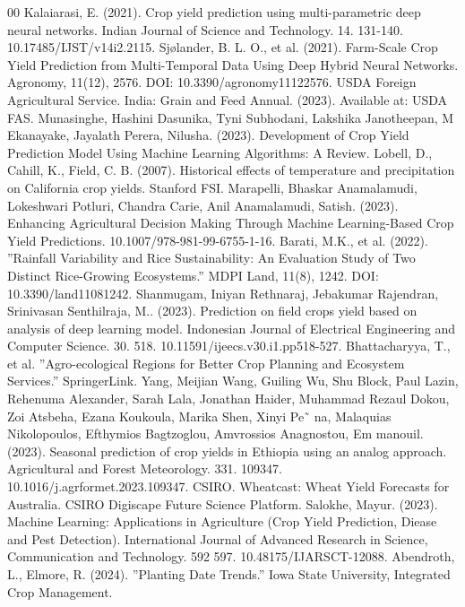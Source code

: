 \documentclass[conference]{IEEEtran}
\begin{document}
\begin{thebibliography}{00}
 Kalaiarasi, E. (2021). Crop yield prediction using multi-parametric deep neural networks. Indian Journal of Science and Technology. 14. 131-140. 10.17485/IJST/v14i2.2115. 
 Sjølander, B. L. O., et al. (2021). Farm-Scale Crop Yield Prediction from Multi-Temporal Data Using Deep Hybrid Neural Networks. Agronomy, 11(12), 2576. DOI: 10.3390/agronomy11122576. 
 USDA Foreign Agricultural Service. India: Grain and Feed Annual. (2023). Available at: USDA FAS. 
 Munasinghe, Hashini Dasunika, Tyni Subhodani, Lakshika Janotheepan, M Ekanayake, Jayalath Perera, Nilusha. (2023). Development of Crop Yield Prediction Model Using Machine Learning Algorithms: A Review.  
 Lobell, D., Cahill, K., Field, C. B. (2007). Historical effects of temperature and precipitation on California crop yields. Stanford FSI. 
 Marapelli, Bhaskar Anamalamudi, Lokeshwari Potluri, Chandra Carie, Anil Anamalamudi, Satish. (2023). Enhancing Agricultural Decision Making Through Machine Learning-Based Crop Yield Predictions. 10.1007/978-981-99-6755-1-16. 
 Barati, M.K., et al. (2022). ”Rainfall Variability and Rice Sustainability: An Evaluation Study of Two Distinct Rice-Growing Ecosystems.” MDPI Land, 11(8), 1242. DOI: 10.3390/land11081242. 
 Shanmugam, Iniyan Rethnaraj, Jebakumar Rajendran, Srinivasan Senthilraja, M.. (2023). Prediction on field crops yield based on analysis of deep learning model. Indonesian Journal of Electrical Engineering and Computer Science. 30. 518. 10.11591/ijeecs.v30.i1.pp518-527. 
 Bhattacharyya, T., et al. ”Agro-ecological Regions for Better Crop Planning and Ecosystem Services.” SpringerLink. 
 Yang, Meijian Wang, Guiling Wu, Shu Block, Paul Lazin, Rehenuma Alexander, Sarah Lala, Jonathan Haider, Muhammad Rezaul Dokou, Zoi Atsbeha, Ezana Koukoula, Marika Shen, Xinyi Pe˜ na, Malaquias Nikolopoulos, Efthymios Bagtzoglou, Amvrossios Anagnostou, Em manouil. (2023). Seasonal prediction of crop yields in Ethiopia using an analog approach. Agricultural and Forest Meteorology. 331. 109347. 10.1016/j.agrformet.2023.109347.
 CSIRO. Wheatcast: Wheat Yield Forecasts for Australia. CSIRO Digiscape Future Science Platform. 
 Salokhe, Mayur. (2023). Machine Learning: Applications in Agriculture (Crop Yield Prediction, Diease and Pest Detection). International Journal of Advanced Research in Science, Communication and Technology. 592 597. 10.48175/IJARSCT-12088. 
 Abendroth, L., Elmore, R. (2024). ”Planting Date Trends.” Iowa State University, Integrated Crop Management. 

\end{thebibliography}
\end{document}
